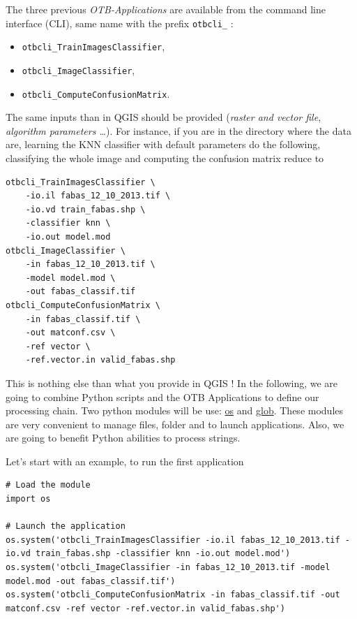 \documentclass[a4paper,11pt,DIV=18]{scrartcl}
\begin{document}
The  three previous  \emph{OTB-Applications} are  available from  the command
line interface (CLI), same name with the prefix \texttt{otbcli\_} :

\begin{itemize}
\item \texttt{otbcli\_TrainImagesClassifier},
\item \texttt{otbcli\_ImageClassifier},
\item \texttt{otbcli\_ComputeConfusionMatrix}.
\end{itemize}

The same  inputs than in  QGIS should  be provided (\emph{raster  and vector
file},  \emph{algorithm parameters  \ldots{}}). For  instance,  if you  are in  the
directory where the data are, learning the KNN classifier with default
parameters do the following, classifying the whole image and computing
the confusion matrix reduce to

\begin{verbatim}
otbcli_TrainImagesClassifier \
    -io.il fabas_12_10_2013.tif \
    -io.vd train_fabas.shp \
    -classifier knn \
    -io.out model.mod
otbcli_ImageClassifier \
    -in fabas_12_10_2013.tif \
    -model model.mod \
    -out fabas_classif.tif
otbcli_ComputeConfusionMatrix \
    -in fabas_classif.tif \
    -out matconf.csv \
    -ref vector \
    -ref.vector.in valid_fabas.shp
\end{verbatim}

This is nothing else than what you provide in QGIS ! In the following,
we are  going to combine  Python scripts  and the OTB  Applications to
define our  processing chain. Two python  modules will be use:  \href{https://docs.python.org/2/library/os.html}{os} and
\href{https://docs.python.org/2/library/glob.html}{glob}.  These modules  are very convenient to manage  files, folder and
to launch applications. Also, we are going to benefit Python abilities
to process strings.

Let's start with an example, to run the first application

\begin{verbatim}
# Load the module
import os

# Launch the application
os.system('otbcli_TrainImagesClassifier -io.il fabas_12_10_2013.tif -io.vd train_fabas.shp -classifier knn -io.out model.mod')
os.system('otbcli_ImageClassifier -in fabas_12_10_2013.tif -model model.mod -out fabas_classif.tif')
os.system('otbcli_ComputeConfusionMatrix -in fabas_classif.tif -out matconf.csv -ref vector -ref.vector.in valid_fabas.shp')
\end{verbatim}
\end{document}
